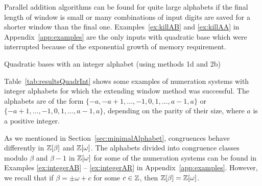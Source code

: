 Parallel addition algorithms can be found for quite large alphabets  if the final length of window is small or many combinations of input digits  are saved for a shorter window than the final one. Examples~\ref{ex:killAB} and \ref{ex:killAA} in Appendix~\ref{app:examples} are the only inputs with quadratic base which were interrupted because of the exponential growth of memory requirement.

 
\begin{table}[htpb]
	\begin{center}
	
	\end{center}
\caption{Quadratic bases with an integer alphabet (using methods 1d and 2b)}
\label{tab:resultsQuadrInt}
\end{table}

Table~\ref{tab:resultsQuadrInt} shows some examples of numeration systems with integer alphabets for which the extending window method was successful. The alphabets are of the form $\{-a, -a+1, \dots, -1,0,1,\dots, a-1,a\}$ or $\{-a+1, \dots, -1,0,1,\dots, a-1,a\}$, depending on the parity of their size, where $a$ is a positive integer.

As we mentioned in Section~\ref{sec:minimalAlphabet}, congruences behave differently in $\mathbb{Z}[\beta]$ and $\mathbb{Z}[\omega]$. The alphabets divided into congruence classes modulo $\beta$ and $\beta-1$ in $\mathbb{Z}[\omega]$ for some of the numeration systems can be found in Examples \ref{ex:integerAB} -- \ref{ex:integerAR} in Appendix~\ref{app:examples}. However, we recall that if $\beta=\pm \omega+c$  for some $c\in\mathbb{Z}$, then $\mathbb{Z}[\beta]=\mathbb{Z}[\omega]$. 

